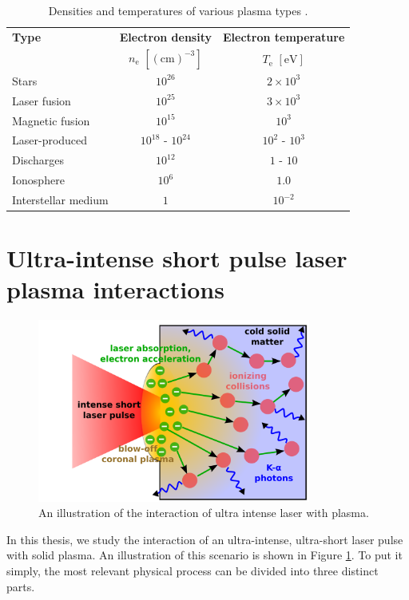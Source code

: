 \begin{table}[hb]
	\centering
	\caption{Densities and temperatures of various plasma types \cite{plasma-intro}.}
	\begin{tabular}{lcc}
		\textbf{Type}		& \textbf{Electron density}			 			 	& \textbf{Electron temperature} \\ 
		& $n_\mathrm{e}$ $\left[\mathrm{(cm)}^{-3}\right]$  &  $T_\mathrm{e}$ $\left[\mathrm{eV}\right]$ \\ \hline
		Stars 				& $10^{26}$          	& $2 \times 10^3$       \\
		Laser fusion    	& $10^{25}$           	& $3 \times 10^3$       \\
		Magnetic fusion		& $10^{15}$ 			& $10^3$         		\\
		Laser-produced		& $10^{18}$ - $10^{24}$ & $10^2$ - $10^3$       \\
		Discharges			& $10^{12}$          	& $1$ - $10$         	\\
		Ionosphere		    & $10^6$            	& $1.0$         		\\
		Interstellar medium & $1$               	& $10^{-2}$         	\\ \hline
	\end{tabular}
	\label{tab:den-temp}
\end{table}

\section{Ultra-intense short pulse laser plasma interactions}
\begin{figure}[h]
	\centering
	\includegraphics[width=0.8\textwidth]{figures/laser-plasma-interaction}
	\caption{An illustration of the interaction of ultra intense laser with plasma.}
	\label{fig:laser-plasma-interaction}
\end{figure}
In this thesis, we study the interaction of an ultra-intense, ultra-short laser pulse with solid plasma. An illustration of this scenario is shown in Figure \ref{fig:laser-plasma-interaction}. To put it simply, the most relevant physical process can be divided into three distinct parts.

